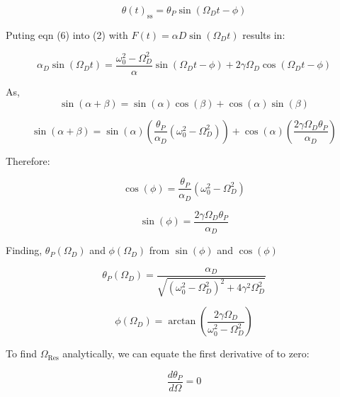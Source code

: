 \documentclass[11pt]{article}
\begin{document}
\begin{equation}
\theta(t)_{\text{ss}} = \theta_P\sin(\Omega_D t - \phi) \tag{6}
\end{equation}

Puting eqn (6) into (2) with $F(t) = \alpha D\sin(\Omega_D t)$ results in:

\begin{equation}
\alpha_D\sin(\Omega_D t) = \frac{\omega_0^2 - \Omega_D^2}{\alpha}\sin(\Omega_D t - \phi) + 2\gamma\Omega_D\cos(\Omega_D t - \phi) \tag{7}
\end{equation}

As,\begin{equation}
\sin(\alpha + \beta) = \sin(\alpha)\cos(\beta) + \cos(\alpha)\sin(\beta) \tag{8}
\end{equation}

\begin{equation}
\sin(\alpha + \beta) = \sin(\alpha)\left(\frac{\theta_P}{\alpha_D}(\omega_0^2 - \Omega_D^2)\right) + \cos(\alpha)\left(\frac{2\gamma\Omega_D\theta_P}{\alpha_D}\right) \tag{9}
\end{equation}

Therefore:

\begin{equation}
\cos(\phi) = \frac{\theta_P}{\alpha_D}(\omega_0^2 - \Omega_D^2)
\tag{10}
\end{equation}

\begin{equation}
\sin(\phi) = \frac{2\gamma\Omega_D\theta_P}{\alpha_D}
\tag{11}
\end{equation}


Finding, $\theta_P(\Omega_D)$ and $\phi(\Omega_D)$  from $\sin(\phi)$ and $\cos(\phi)$


\begin{equation}
\theta_P(\Omega_D) = \frac{\alpha_D}{\sqrt{(\omega_0^2 - \Omega_D^2)^2 + 4\gamma^2\Omega_D^2}} \tag{12}
\end{equation}


\begin{equation}
\phi(\Omega_D) = \arctan\left(\frac{2\gamma\Omega_D}{\omega_0^2 - \Omega_D^2}\right) \tag{13}
\end{equation}

To find $\Omega_{\text{Res}}$ analytically, we can equate the first derivative of to zero:

\begin{equation}
\frac{d\theta_P}{d\Omega} = 0  \tag{13}
\end{equation}
\end{document}
